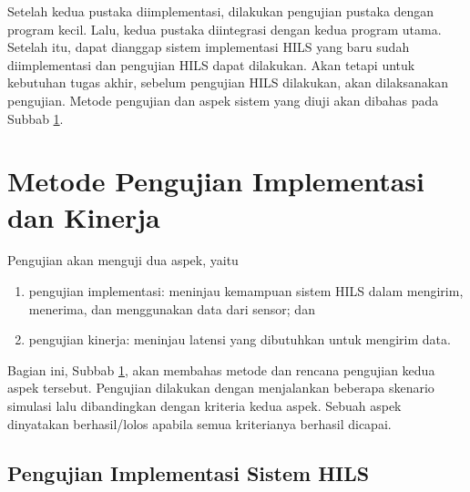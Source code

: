 Setelah kedua pustaka diimplementasi, dilakukan pengujian pustaka dengan program
kecil. Lalu, kedua pustaka diintegrasi dengan kedua program utama. Setelah itu,
dapat dianggap sistem implementasi HILS yang baru sudah diimplementasi dan
pengujian HILS dapat dilakukan. Akan tetapi untuk kebutuhan tugas akhir, sebelum
pengujian HILS dilakukan, akan dilaksanakan pengujian. Metode pengujian dan
aspek sistem yang diuji akan dibahas pada Subbab
\ref{chapter-4-testing-methodology}.

\section{Metode Pengujian Implementasi dan
  Kinerja}\label{chapter-4-testing-methodology}

Pengujian akan menguji dua aspek, yaitu
\begin{enumerate}
	\item pengujian implementasi: meninjau kemampuan sistem HILS dalam mengirim,
	      menerima, dan menggunakan data dari sensor; dan
	\item pengujian kinerja: meninjau latensi yang dibutuhkan untuk mengirim
	      data.
\end{enumerate}
Bagian ini, Subbab \ref{chapter-4-testing-methodology}, akan membahas metode dan
rencana pengujian kedua aspek tersebut. Pengujian dilakukan dengan menjalankan
beberapa skenario simulasi lalu dibandingkan dengan kriteria kedua aspek. Sebuah
aspek dinyatakan berhasil/lolos apabila semua kriterianya berhasil dicapai.

\subsection{Pengujian Implementasi Sistem HILS}

